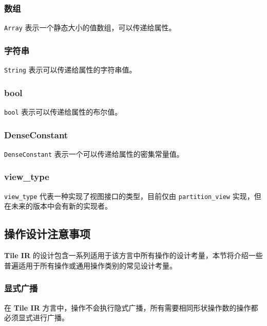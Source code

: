 \documentclass{article}
\begin{document}
\subsubsection{数组}

\texttt{Array} 表示一个静态大小的值数组，可以传递给属性。



\subsubsection{字符串}

\texttt{String} 表示可以传递给属性的字符串值。



\subsubsection{bool}

\texttt{bool} 表示可以传递给属性的布尔值。



\subsubsection{DenseConstant}

\texttt{DenseConstant} 表示一个可以传递给属性的密集常量值。



\subsubsection{view\_type}

\texttt{view\_type} 代表一种实现了视图接口的类型，目前仅由 \texttt{partition\_view} 实现，但在未来的版本中会有新的实现者。



\subsection{操作设计注意事项}

\textbf{Tile IR} 的设计包含一系列适用于该方言中所有操作的设计考量，本节将介绍一些普遍适用于所有操作或通用操作类别的常见设计考量。


\subsubsection{显式广播}

在 \textbf{Tile IR} 方言中，操作不会执行隐式广播，所有需要相同形状操作数的操作都必须显式进行广播。
\end{document}
